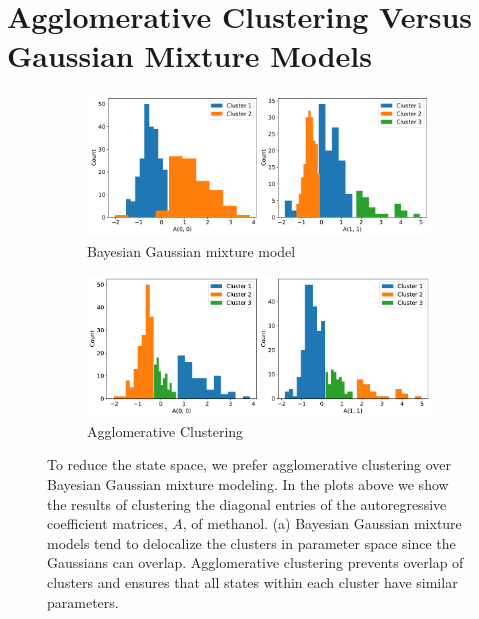 \documentclass{article}
\begin{document}
  \newpage
  
  \section{Agglomerative Clustering Versus Gaussian Mixture Models}\label{section:agglomerative}
  
  
  \begin{figure}[h]
  \centering
  \begin{subfigure}{0.95\textwidth}
  \includegraphics[width=\textwidth]{bayesian_A.pdf}
  \caption{Bayesian Gaussian mixture model}\label{fig:bayesian_A}
  \end{subfigure}
  \begin{subfigure}{0.95\textwidth}
  \includegraphics[width=\textwidth]{agglomerative_A.pdf}
  \caption{Agglomerative Clustering}\label{fig:agglomerative_A}
  \end{subfigure}
  \caption{To reduce the state space, we prefer agglomerative clustering over Bayesian
  Gaussian mixture modeling. In the plots above we show the results of clustering the
  diagonal entries of the autoregressive coefficient matrices, $A$, of methanol. (a) 
  Bayesian Gaussian mixture models tend to delocalize the clusters in parameter space
  since the Gaussians can overlap. Agglomerative clustering prevents overlap of 
  clusters and ensures that all states within each cluster have similar parameters.
  }\label{fig:clustering_choice}
  \end{figure}
  
\end{document}
